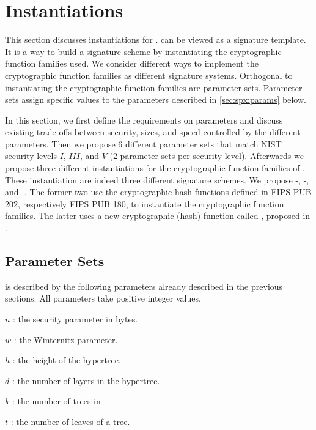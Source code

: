 \section{Instantiations}
\label{sec:instantiations}

This section discusses instantiations for \spx. \spx can be 
viewed as a signature template. It is a way to build a signature 
scheme by instantiating the cryptographic function families used. We consider
different ways to implement the cryptographic function families as 
different signature systems. Orthogonal to instantiating the cryptographic 
function families are parameter sets. Parameter sets
assign  specific values to the \spx parameters described in \autoref{sec:spx:params} below. 

In this section, we first define the requirements on parameters and discuss 
existing trade-offs between 
security, sizes, and speed controlled by the different parameters. Then we 
propose 6 different parameter sets that match NIST security levels $I$, 
$III$, and $V$ (2 parameter sets per security level). Afterwards we propose 
three different instantiations for the cryptographic function families of \spx. 
These instantiation are indeed three different signature schemes. We propose 
\spx-\shathree, \spx-\shatwo, and \spx-\haraka. The 
former two use the cryptographic hash functions defined in FIPS PUB 202, 
respectively FIPS PUB 180, to instantiate the cryptographic function families. 
The latter uses a new cryptographic (hash) function called \haraka, proposed in
\cite{articleToSC563}. 

\subsection{\spx Parameter Sets}\label{sec:spx:params}
\spx is described by the following parameters already described in the previous 
sections. All parameters take positive integer values.
\begin{description}
 \item  $n$ : the security parameter in bytes.
 \item  $w$ : the Winternitz parameter.
 \item  $h$ : the height of the hypertree.
 \item  $d$ : the number of layers in the hypertree.
 \item  $k$ : the number of trees in \fors.
 \item  $t$ : the number of leaves of a \fors tree.
\end{description}

